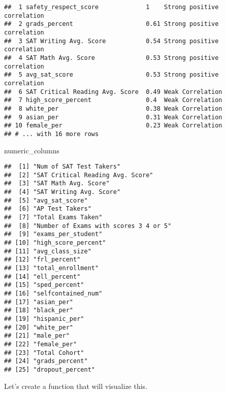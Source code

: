 \documentclass[]{article}
\newenvironment{Shaded}{\begin{snugshade}}{\end{snugshade}}
\newcommand{\NormalTok}[1]{#1}
\begin{document}
\begin{verbatim}
##  1 safety_respect_score             1    Strong positive correlation
##  2 grads_percent                    0.61 Strong positive correlation
##  3 SAT Writing Avg. Score           0.54 Strong positive correlation
##  4 SAT Math Avg. Score              0.53 Strong positive correlation
##  5 avg_sat_score                    0.53 Strong positive correlation
##  6 SAT Critical Reading Avg. Score  0.49 Weak Correlation           
##  7 high_score_percent               0.4  Weak Correlation           
##  8 white_per                        0.38 Weak Correlation           
##  9 asian_per                        0.31 Weak Correlation           
## 10 female_per                       0.23 Weak Correlation           
## # ... with 16 more rows
\end{verbatim}

\begin{Shaded}
\begin{Highlighting}[]
\NormalTok{numeric_columns}
\end{Highlighting}
\end{Shaded}

\begin{verbatim}
##  [1] "Num of SAT Test Takers"              
##  [2] "SAT Critical Reading Avg. Score"     
##  [3] "SAT Math Avg. Score"                 
##  [4] "SAT Writing Avg. Score"              
##  [5] "avg_sat_score"                       
##  [6] "AP Test Takers"                      
##  [7] "Total Exams Taken"                   
##  [8] "Number of Exams with scores 3 4 or 5"
##  [9] "exams_per_student"                   
## [10] "high_score_percent"                  
## [11] "avg_class_size"                      
## [12] "frl_percent"                         
## [13] "total_enrollment"                    
## [14] "ell_percent"                         
## [15] "sped_percent"                        
## [16] "selfcontained_num"                   
## [17] "asian_per"                           
## [18] "black_per"                           
## [19] "hispanic_per"                        
## [20] "white_per"                           
## [21] "male_per"                            
## [22] "female_per"                          
## [23] "Total Cohort"                        
## [24] "grads_percent"                       
## [25] "dropout_percent"
\end{verbatim}

Let's create a function that will visualize this.
\end{document}
